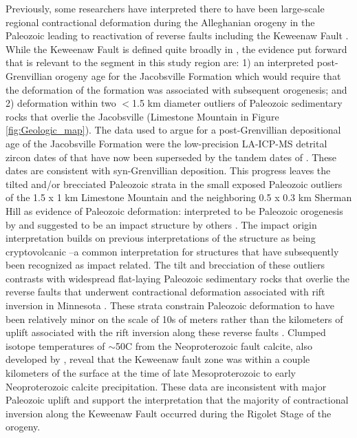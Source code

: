 Previously, some researchers have interpreted there to have been large-scale regional contractional deformation during the Alleghanian orogeny in the Paleozoic leading to reactivation of reverse faults including the Keweenaw Fault \cite{Craddock2017a}. While the Keweenaw Fault is defined quite broadly in , the evidence put forward that is relevant to the segment in this study region are: 1) an interpreted post-Grenvillian orogeny age for the Jacobsville Formation which would require that the deformation of the formation was associated with subsequent orogenesis; and 2) deformation within two $<$1.5 km diameter outliers of Paleozoic sedimentary rocks that overlie the Jacobsville (Limestone Mountain in Figure \ref{fig:Geologic_map}). The data used to argue for a post-Grenvillian depositional age of the Jacobsville Formation were the low-precision LA-ICP-MS detrital zircon dates of  that have now been superseded by the tandem dates of . These dates are consistent with syn-Grenvillian deposition. This progress leaves the tilted and/or brecciated Paleozoic strata in the small exposed Paleozoic outliers of the 1.5 x 1 km Limestone Mountain and the neighboring 0.5 x 0.3 km Sherman Hill as evidence of Paleozoic deformation: interpreted to be Paleozoic orogenesis by  and suggested to be an impact structure by others \cite{Milstein1987a}. The impact origin interpretation builds on previous interpretations of the structure as being cryptovolcanic \cite{Cannon1981a}--a common interpretation for structures that have subsequently been recognized as impact related. The tilt and brecciation of these outliers contrasts with widespread flat-laying Paleozoic sedimentary rocks that overlie the reverse faults that underwent contractional deformation associated with rift inversion in Minnesota \cite{Jirsa2011a}. These strata constrain Paleozoic deformation to have been relatively minor on the scale of 10s of meters rather than the kilometers of uplift associated with the rift inversion along these reverse faults \cite{Boerboom2018a}. Clumped isotope temperatures of $\sim$50\textdegree C from the Neoproterozoic fault calcite, also developed by , reveal that the Keweenaw fault zone was within a couple kilometers of the surface at the time of late Mesoproterozoic to early Neoproterozoic calcite precipitation. These data are inconsistent with major Paleozoic uplift and support the interpretation that the majority of contractional inversion along the Keweenaw Fault occurred during the Rigolet Stage of the orogeny. 

